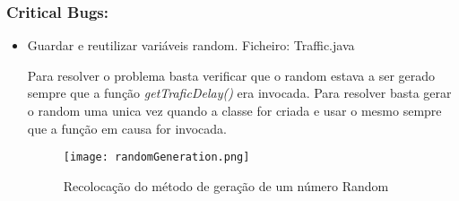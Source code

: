 \subsubsection{Critical Bugs:}
\begin{itemize}
\item Guardar e reutilizar variáveis random.\newline
 Ficheiro: Traffic.java \newline


\par Para resolver o problema basta verificar que o random estava a ser gerado sempre que a função \textit{getTraficDelay()} era invocada. Para resolver basta gerar o random uma unica vez quando a classe for criada e usar o mesmo sempre que a função em causa for invocada.

\begin{figure}[H]

  \centering

  \texttt{[image: randomGeneration.png]}

  \caption {Recolocação do método de geração de um número Random}

  \label {fig06}

\end{figure}
\end{itemize}

